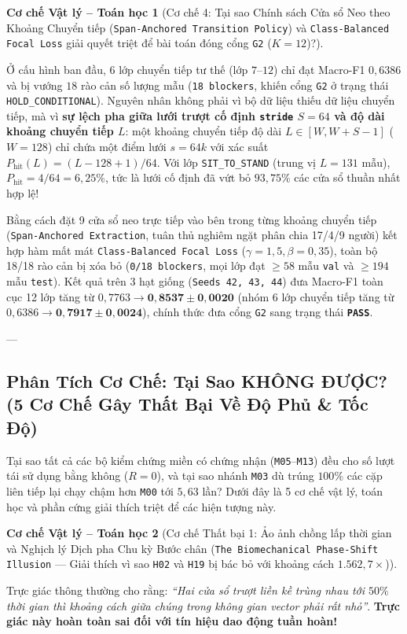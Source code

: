\documentclass[11pt,a4paper]{article}
\newcommand{\code}[1]{{\small\ttfamily\nolinkurl{#1}}}
\newtheorem{mechanism}{Cơ chế Vật lý -- Toán học}[section]
\begin{document}
\begin{mechanism}[Cơ chế 4: Tại sao Chính sách Cửa sổ Neo theo Khoảng Chuyển tiếp (\code{Span-Anchored Transition Policy}) và \code{Class-Balanced Focal Loss} giải quyết triệt để bài toán đóng cổng \code{G2} ($K=12$)?]
\end{mechanism}
Ở cấu hình ban đầu, 6 lớp chuyển tiếp tư thế (lớp $7$--$12$) chỉ đạt Macro-F1 $0,6386$ và bị vướng $18$ rào cản số lượng mẫu (\code{18 blockers}, khiến cổng \code{G2} ở trạng thái \code{HOLD\_CONDITIONAL}). Nguyên nhân không phải vì bộ dữ liệu thiếu dữ liệu chuyển tiếp, mà vì \textbf{sự lệch pha giữa lưới trượt cố định \code{stride} $S=64$ và độ dài khoảng chuyển tiếp $L$}: một khoảng chuyển tiếp độ dài $L \in [W, W+S-1]$ ($W=128$) chỉ chứa một điểm lưới $s = 64k$ với xác suất $P_{\text{hit}}(L) = (L - 128 + 1)/64$. Với lớp \code{SIT\_TO\_STAND} (trung vị $L=131$ mẫu), $P_{\text{hit}} = 4/64 = 6,25\%$, tức là lưới cố định đã vứt bỏ $93,75\%$ các cửa sổ thuần nhất hợp lệ!

Bằng cách đặt 9 cửa sổ neo trực tiếp vào bên trong từng khoảng chuyển tiếp (\code{Span-Anchored Extraction}, tuân thủ nghiêm ngặt phân chia 17/4/9 người) kết hợp hàm mất mát \code{Class-Balanced Focal Loss} ($\gamma=1,5, \beta=0,35$), toàn bộ 18/18 rào cản bị xóa bỏ (\code{0/18 blockers}, mọi lớp đạt $\ge 58$ mẫu \code{val} và $\ge 194$ mẫu \code{test}). Kết quả trên 3 hạt giống (\code{Seeds 42, 43, 44}) đưa Macro-F1 toàn cục 12 lớp tăng từ $0,7763 \to \mathbf{0,8537 \pm 0,0020}$ (nhóm 6 lớp chuyển tiếp tăng từ $0,6386 \to \mathbf{0,7917 \pm 0,0024}$), chính thức đưa cổng \code{G2} sang trạng thái \textbf{\code{PASS}}.

---

\subsection{Phân Tích Cơ Chế: Tại Sao KHÔNG ĐƯỢC? (5 Cơ Chế Gây Thất Bại Về Độ Phủ \& Tốc Độ)}

Tại sao tất cả các bộ kiểm chứng miền có chứng nhận (\code{M05}--\code{M13}) đều cho số lượt tái sử dụng bằng không ($R = 0$), và tại sao nhánh \code{M03} dù trúng $100\%$ các cặp liên tiếp lại chạy chậm hơn \code{M00} tới $5,63$ lần? Dưới đây là 5 cơ chế vật lý, toán học và phần cứng giải thích triệt để các hiện tượng này.

\begin{mechanism}[Cơ chế Thất bại 1: Ảo ảnh chồng lấp thời gian và Nghịch lý Dịch pha Chu kỳ Bước chân (\code{The Biomechanical Phase-Shift Illusion} --- Giải thích vì sao \code{H02} và \code{H19} bị bác bỏ với khoảng cách $1.562,7\times$)]
\end{mechanism}
Trực giác thông thường cho rằng: \textit{``Hai cửa sổ trượt liền kề trùng nhau tới $50\%$ thời gian thì khoảng cách giữa chúng trong không gian vector phải rất nhỏ''}. \textbf{Trực giác này hoàn toàn sai đối với tín hiệu dao động tuần hoàn!}
\end{document}
